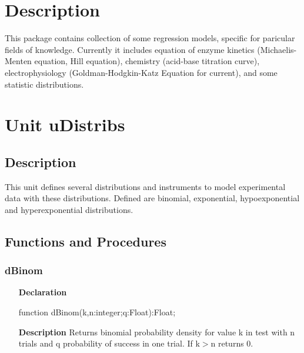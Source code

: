 \documentclass[12pt,a4paper,oneside]{report}
\newcommand{\lmath}[1]{   %
	\marginpar{\vspace{#1} 
		\begin{flushright}
			LMath
	\end{flushright} }
}
\newcommand{\declarationitem}[1]{\textbf{#1}}
\newcommand{\descriptiontitle}[1]{\textbf{#1}}
\begin{document}
\section{Description}
This package contains collection of some regression models, specific for paricular fields of knowledge. Currently it includes equation of enzyme kinetics (Michaelis-Menten equation, Hill equation), chemistry (acid-base titration curve), electrophysiology (Goldman-Hodgkin-Katz Equation for current), and some statistic distributions.
\section{Unit uDistribs}\lmath{-24pt}
\label{udistribs}
\subsection{Description}
This unit defines several distributions and instruments to model experimental data with these distributions. Defined are binomial, exponential, hypoexponential and hyperexponential distributions.
\subsection{Functions and Procedures}
\subsubsection{dBinom}
\label{udistribs-dBinom}
\begin{itemize}\item[\declarationitem{Declaration}\hfill]
	\begin{flushleft}
		\begin{ttfamily}
			function dBinom(k,n:integer;q:Float):Float;\end{ttfamily}
		
	\end{flushleft}
	
	\par
	\item[\descriptiontitle{Description}]
	Returns binomial probability density for value k in test with n trials and q probability of success in one trial. If k{$>$}n returns 0.
	
\end{itemize}
\end{document}
